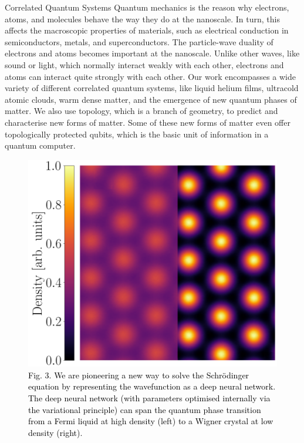 \documentclass[xcolor={table}]{beamer}
\begin{document}
\begin{frame}[fragile=singleslide,t]
\begin{columns}[onlytextwidth,T]
\begin{column}{.47\textwidth}
\begin{block}{Correlated Quantum Systems}
Quantum mechanics is the reason why electrons, atoms, and molecules behave the way they do at the nanoscale. In turn, this affects the macroscopic properties of materials, such as electrical conduction in semiconductors, metals, and superconductors. The particle-wave duality of electrons and atoms becomes important at the nanoscale. Unlike other waves, like sound or light, which normally interact weakly with each other, electrons and atoms can interact quite strongly with each other. Our work encompasses a wide variety of different correlated quantum systems, like liquid helium films, ultracold atomic clouds, warm dense matter, and the emergence of new quantum phases of matter. We also use topology, which is a branch of geometry, to predict and characterise new forms of matter. Some of these new forms of matter even offer topologically protected qubits, which is the basic unit of information in a quantum computer.
\end{block}
\vspace*{-1.5cm}
\begin{figure}
\centering
    \includegraphics[width=0.52\columnwidth]{crystallisation.png}
    \caption{\footnotesize \textcolor{black}{Fig. 3. We are pioneering a new way to solve the Schr{\"o}dinger equation by representing the wavefunction as a deep neural network. The deep neural network (with parameters optimised internally via the variational principle) can span the quantum phase transition from a Fermi liquid at high density (left) to a Wigner crystal at low density (right).}}
\end{figure}


\end{column}
\end{columns}
\end{frame}
\end{document}
